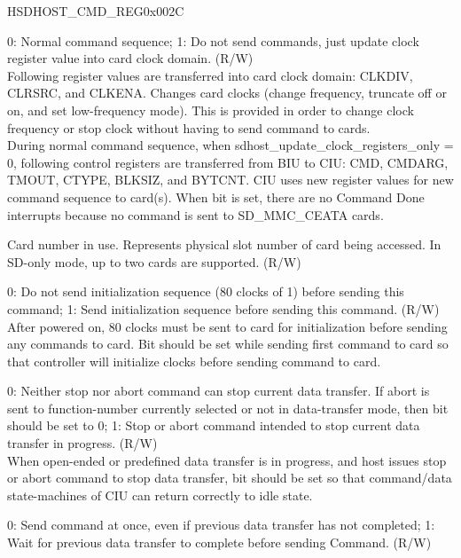 \begin{register}{H}{SDHOST\_CMD\_REG}{0x{}002C}
\begin{regdesc}\begin{reglist}
\item [Continued from the previous page...]
\item [SDHOST\_UPDATE\_CLOCK\_REGISTERS\_ONLY] 0: Normal command sequence; 1: Do not send commands, just update clock register value into card clock domain.  (R/W)\\
Following register values are transferred into card clock domain: CLKDIV, CLRSRC, and CLKENA.
Changes card clocks (change frequency, truncate off or on, and set low-frequency mode). This is provided in order to change clock frequency or stop clock without having to send command to cards.\\ During normal command sequence, when sdhost\_update\_clock\_registers\_only = 0, following control registers are transferred from BIU to CIU: CMD, CMDARG, TMOUT, CTYPE, BLKSIZ, and BYTCNT. CIU uses new register values for new command sequence to card(s). When bit is set, there are no Command Done interrupts because no command is sent to SD\_MMC\_CEATA cards.
\item [SDHOST\_CARD\_NUMBER]Card number in use. Represents physical slot number of card being accessed. In SD-only mode, up to two cards are supported. (R/W)
\item [SDHOST\_SEND\_INITIALIZATION] 0: Do not send initialization sequence (80 clocks of 1) before sending this command; 1: Send initialization sequence before sending this command. (R/W)\\
After powered on, 80 clocks must be sent to card for initialization before sending any commands to card. Bit should be set while sending first command to card so that controller will initialize clocks before sending command to card.
\item [SDHOST\_STOP\_ABORT\_CMD] 0: Neither stop nor abort command can stop current data transfer. If abort is sent to function-number currently selected or not in data-transfer mode, then bit should be set to 0; 1: Stop or abort command intended to stop current data transfer in progress.  (R/W)\\
When open-ended or predefined data transfer is in progress, and host issues stop or abort command to stop data transfer, bit should be set so that command/data state-machines of CIU can return correctly to idle state.
\item [SDHOST\_WAIT\_PRVDATA\_COMPLETE] 0: Send command at once, even if previous data transfer has not completed; 1: Wait for previous data transfer to complete before sending Command. (R/W)\\

\end{reglist}
\end{regdesc}
\end{register}
